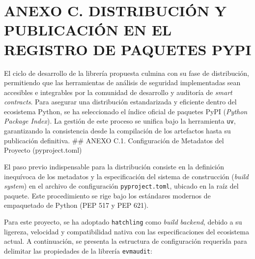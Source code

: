 \section{ANEXO C. DISTRIBUCIÓN Y PUBLICACIÓN EN EL REGISTRO DE PAQUETES
PYPI}\label{anexo-c.-distribuciuxf3n-y-publicaciuxf3n-en-el-registro-de-paquetes-pypi}

El ciclo de desarrollo de la librería propuesta culmina con su fase de
distribución, permitiendo que las herramientas de análisis de seguridad
implementadas sean accesibles e integrables por la comunidad de
desarrollo y auditoría de \emph{smart contracts}. Para asegurar una
distribución estandarizada y eficiente dentro del ecosistema Python, se
ha seleccionado el índice oficial de paquetes PyPI (\emph{Python Package
Index}). La gestión de este proceso se unifica bajo la herramienta
\texttt{uv}, garantizando la consistencia desde la compilación de los
artefactos hasta su publicación definitiva. \#\# ANEXO C.1.
Configuración de Metadatos del Proyecto (pyproject.toml)

El paso previo indispensable para la distribución consiste en la
definición inequívoca de los metadatos y la especificación del sistema
de construcción (\emph{build system}) en el archivo de configuración
\texttt{pyproject.toml}, ubicado en la raíz del paquete. Este
procedimiento se rige bajo los estándares modernos de empaquetado de
Python (PEP 517 y PEP 621).

Para este proyecto, se ha adoptado \texttt{hatchling} como \emph{build
backend}, debido a su ligereza, velocidad y compatibilidad nativa con
las especificaciones del ecosistema actual. A continuación, se presenta
la estructura de configuración requerida para delimitar las propiedades
de la librería \texttt{evmaudit}:

